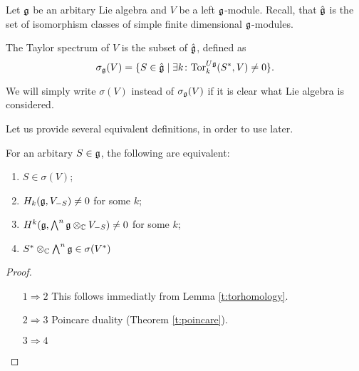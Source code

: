 Let $\mathfrak{g}$ be an arbitary Lie algebra and $V$ be a left $\mathfrak{g}$-module. 
Recall, that $\hat{\mathfrak{g}}$ is the set of isomorphism classes of simple
finite dimensional $\mathfrak{g}$-modules.
\begin{definition}
    The Taylor spectrum of $V$ is the subset of $\hat{\mathfrak{g}}$, defined as
    \[
        \sigma_{\mathfrak{g}}(V)=\{ S\in \hat{\mathfrak{g}} \mid \exists 
            k \colon \mathrm{Tor}^{U\mathfrak{g}}_k(S^*,V)\neq 0\}.
    \]
\end{definition}
We will simply write $\sigma(V)$ instead of $\sigma_{\mathfrak{g}}(V)$ if it is clear what Lie algebra is
considered.

Let us provide several equivalent definitions, in order to use later.
\begin{theorem}
   For an arbitary $S\in\mathfrak{g}$, the following are equivalent:
   \begin{enumerate}
       \item $S \in \sigma(V)$; 
           
       \item $H_k(\mathfrak{g}, V_{-S}) \ne 0$ for some $k$;

       \item $H^k(\mathfrak{g}, \bigwedge^n\mathfrak{g}\otimes_{\mathbb{C}} V_{-S}) \ne 0$ for some $k$;

       \item $S^* \otimes_{\mathbb{C}} \bigwedge^n\mathfrak{g} \in \sigma(V^*)$
   \end{enumerate}
\end{theorem}
\begin{proof}
    \begin{itemize}
        \item[$1 \Rightarrow 2$]
            This follows immediatly from Lemma \ref{t:torhomology}.

        \item[$2 \Rightarrow 3$]
            Poincare duality (Theorem \ref{t:poincare}).

        \item[$3 \Rightarrow 4$] 

    \end{itemize}
\end{proof}
